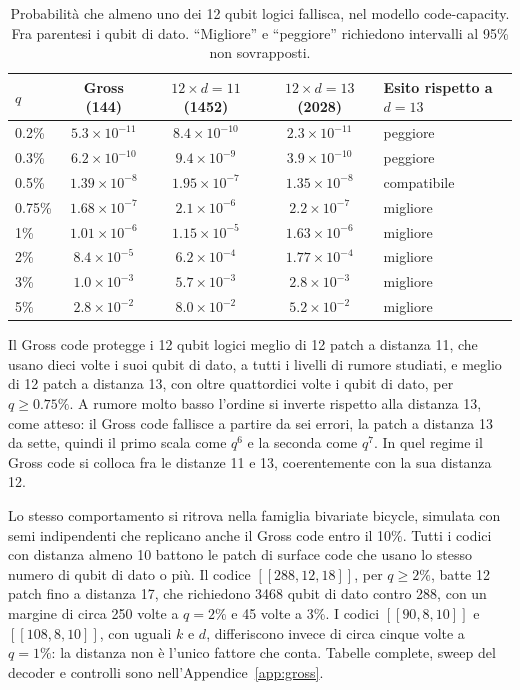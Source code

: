 \begin{table}[H]
\centering
\small
\caption{Probabilità che almeno uno dei 12 qubit logici fallisca, nel modello code-capacity. Fra parentesi i qubit di dato. ``Migliore'' e ``peggiore'' richiedono intervalli al 95\% non sovrapposti.}
\label{tab:finale_5_gross_confronto}
\begin{tabular}{@{}lcccl@{}}
\toprule
\(q\) & Gross (144) & \(12\times d{=}11\) (1452) & \(12\times d{=}13\) (2028) & Esito rispetto a \(d=13\) \\
\midrule
0.2\% & \(5.3\times10^{-11}\) & \(8.4\times10^{-10}\) & \(2.3\times10^{-11}\) & peggiore \\
0.3\% & \(6.2\times10^{-10}\) & \(9.4\times10^{-9}\) & \(3.9\times10^{-10}\) & peggiore \\
0.5\% & \(1.39\times10^{-8}\) & \(1.95\times10^{-7}\) & \(1.35\times10^{-8}\) & compatibile \\
0.75\% & \(1.68\times10^{-7}\) & \(2.1\times10^{-6}\) & \(2.2\times10^{-7}\) & migliore \\
1\% & \(1.01\times10^{-6}\) & \(1.15\times10^{-5}\) & \(1.63\times10^{-6}\) & migliore \\
2\% & \(8.4\times10^{-5}\) & \(6.2\times10^{-4}\) & \(1.77\times10^{-4}\) & migliore \\
3\% & \(1.0\times10^{-3}\) & \(5.7\times10^{-3}\) & \(2.8\times10^{-3}\) & migliore \\
5\% & \(2.8\times10^{-2}\) & \(8.0\times10^{-2}\) & \(5.2\times10^{-2}\) & migliore \\
\bottomrule
\end{tabular}
\end{table}

Il Gross code protegge i 12 qubit logici meglio di 12 patch a distanza 11, che usano dieci volte i suoi qubit di dato, a tutti i livelli di rumore studiati, e meglio di 12 patch a distanza 13, con oltre quattordici volte i qubit di dato, per \(q \ge 0.75\%\). A rumore molto basso l'ordine si inverte rispetto alla distanza 13, come atteso: il Gross code fallisce a partire da sei errori, la patch a distanza 13 da sette, quindi il primo scala come \(q^6\) e la seconda come \(q^7\). In quel regime il Gross code si colloca fra le distanze 11 e 13, coerentemente con la sua distanza 12.

Lo stesso comportamento si ritrova nella famiglia bivariate bicycle, simulata con semi indipendenti che replicano anche il Gross code entro il 10\%. Tutti i codici con distanza almeno 10 battono le patch di surface code che usano lo stesso numero di qubit di dato o più. Il codice \ensuremath{[[288,12,18]]}, per \(q \ge 2\%\), batte 12 patch fino a distanza 17, che richiedono 3468 qubit di dato contro 288, con un margine di circa 250 volte a \(q = 2\%\) e 45 volte a 3\%. I codici \ensuremath{[[90,8,10]]} e \ensuremath{[[108,8,10]]}, con uguali \(k\) e \(d\), differiscono invece di circa cinque volte a \(q = 1\%\): la distanza non è l'unico fattore che conta. Tabelle complete, sweep del decoder e controlli sono nell'Appendice~\ref{app:gross}.

